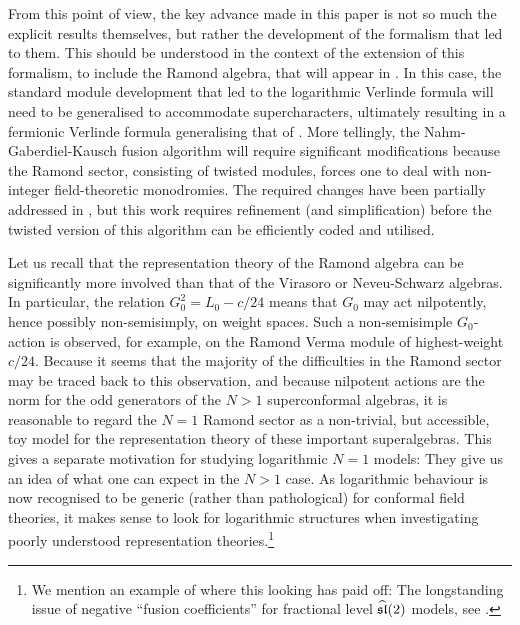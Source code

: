 \documentclass[a4paper,reqno,12pt]{report}
\theoremstyle{definition}
\numberwithin{equation}{section}
\let\originalleft\left     %
\let\originalright\right
\renewcommand{\left}{\mathopen{}\mathclose\bgroup\originalleft}
\renewcommand{\right}{\aftergroup\egroup\originalright}
\newcommand{\alg}[1]{\mathfrak{#1}} %
\newcommand{\affine}[1]{\widehat{#1}}
\newcommand{\AKMA}[2]{\affine{\alg{#1}} \left( #2 \right)}                  %
\newcommand{\cfts}{conformal field theories}
\newcommand{\hw}{highest-weight}
\newcommand{\NGK}{Nahm-Gaberdiel-Kausch}
\newcommand{\ns}{Neveu-Schwarz}
\theoremstyle{plain}
\begin{document}
From this point of view, the key advance made in this paper is not so much the explicit results themselves, but rather the development of the formalism that led to them.  This should be understood in the context of the extension of this formalism, to include the Ramond algebra, that will appear in \cite{CanFusII15}.  In this case, the standard module development that led to the logarithmic Verlinde formula will need to be generalised to accommodate supercharacters, ultimately resulting in a fermionic Verlinde formula generalising that of \cite{EhoFus94}.  More tellingly, the \NGK{} fusion algorithm will require significant modifications because the Ramond sector, consisting of twisted modules, forces one to deal with non-integer field-theoretic monodromies.  The required changes have been partially addressed in \cite{GabFus97}, but this work requires refinement (and simplification) before the twisted version of this algorithm can be efficiently coded and utilised.

Let us recall that the representation theory of the Ramond algebra can be significantly more involved than that of the Virasoro or \ns{} algebras.  In particular, the relation $G_0^2 = L_0 - c/24$ means that $G_0$ may act nilpotently, hence possibly non-semisimply, on weight spaces.  Such a non-semisimple $G_0$-action is observed, for example, on the Ramond Verma module of \hw{} $c/24$.  Because it seems that the majority of the difficulties in the Ramond sector may be traced back to this observation, and because nilpotent actions are the norm for the odd generators of the $N>1$ superconformal algebras, it is reasonable to regard the $N=1$ Ramond sector as a non-trivial, but accessible, toy model for the representation theory of these important superalgebras.  This gives a separate motivation for studying logarithmic $N=1$ models:  They give us an idea of what one can expect in the $N>1$ case.  As logarithmic behaviour is now recognised to be generic (rather than pathological) for \cfts{}, it makes sense to look for logarithmic structures when investigating poorly understood representation theories.\footnote{We mention an example of where this looking has paid off:  The longstanding issue of negative ``fusion coefficients'' for fractional level $\AKMA{sl}{2}$ models, see \cite{RidSL208,CreMod12}.}
\end{document}
